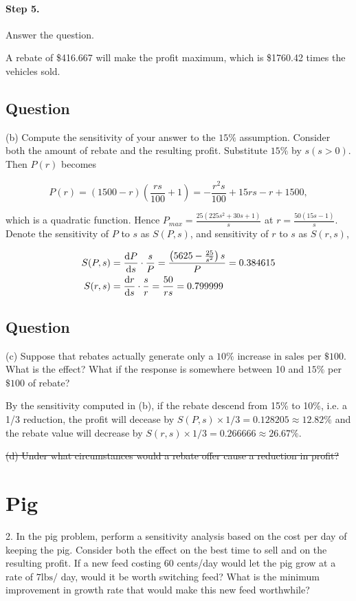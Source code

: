 \documentclass[11pt]{article}
\begin{document}
\paragraph{Step 5.} Answer the question.

A rebate of \$416.667 will make the profit maximum, which is \$1760.42 times the vehicles sold.



\subsection{Question}
(b) Compute the sensitivity of your answer to the $15 \%$ assumption. Consider both the amount of rebate and the resulting profit.
Substitute $15 \%$ by $s(s>0)$. Then $P(r)$ becomes

$$
P(r) = (1500-r) \left(\frac{r s}{100}+1\right)= -\frac{r^2 s}{100}+15 r s-r+1500,
$$

which is a quadratic function. Hence $P_{max}  = \frac{25 \left(225 s^2+30 s+1\right)}{s}$ at $r = \frac{50 (15 s-1)}{s}$. Denote the sensitivity of $P$ to $s$ as $S(P,s)$, and sensitivity of $r$ to $s$ as $S(r,s)$,

$$
\begin{align*}
	S(P,s) &= \frac{\textrm d P}{\textrm d s} \cdot \frac{s}{P}=\frac{\left(5625-\frac{25}{s^2}\right) s}{P} = 0.384615
	\\
	S(r,s) & = \frac{\textrm d r}{\textrm d s} \cdot \frac{s}{r} =\frac{50}{r s}  = 0.799999
\end{align*}
$$

\subsection{Question}
(c) Suppose that rebates actually generate only a $10 \%$ increase in sales per $\$ 100$. What is the effect? What if the response is somewhere between 10 and $15 \%$ per $\$ 100$ of rebate?

By the sensitivity computed in (b), if the rebate descend from 15\% to 10\%, i.e. a 1/3 reduction, the profit will decease by $S(P,s) \times 1/3 = 0.128205 \approx 12.82\%$ and the rebate value will decrease by $S(r,s) \times 1/3 = 0.266666 \approx 26.67\%$.

\sout{(d) Under what circumstances would a rebate offer cause a reduction in profit?}
\section{Pig}
2. In the pig problem, perform a sensitivity analysis based on the cost per day of keeping the pig. Consider both the effect on the best time to sell and on the resulting profit. If a new feed costing 60 cents/day would let the pig grow at a rate of $7 \mathrm{lbs} /$ day, would it be worth switching feed? What is the minimum improvement in growth rate that would make this new feed worthwhile?
\end{document}
